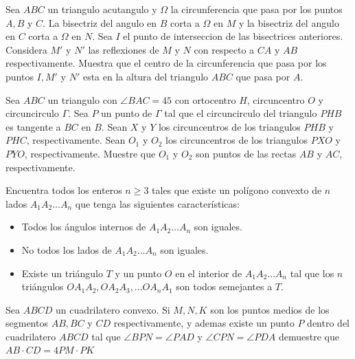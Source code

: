 \documentclass[11pt]{scrartcl}
\begin{document}
\begin{problem}
[2018/6] Sea $ABC$ un triangulo acutangulo y $\Omega$ la circunferencia que pasa por los puntos $A,B$ y $C$. La bisectriz del angulo en $B$ corta a $\Omega$ en $M$ y la bisectriz del angulo en $C$ corta a $\Omega$ en $N$. Sea $I$ el punto de interseccion de las bisectrices anteriores. Considera $M'$ y $N'$ las reflexiones de $M$ y $N$ con respecto a $CA$ y $AB$ respectivamente. Muestra que el centro de la circunferencia que pasa por los puntos $I,M'$ y $N'$ esta en la altura del triangulo $ABC$ que pasa por $A$.
\end{problem}

\begin{problem}
[2019/6] Sea $ABC$ un triangulo con $\angle{BAC}=45$ con ortocentro $H$, circuncentro $O$ y circuncirculo $\Gamma$. Sea $P$ un punto de $\Gamma$ tal que el circuncirculo del triangulo $PHB$ es tangente a $BC$ en $B$. Sean $X$ y $Y$ los circuncentros de los triangulos $PHB$ y $PHC$, respectivamente. Sean $O_1$ y $O_2$ los circuncentros de los triangulos $PXO$ y $PYO$, respectivamente. Muestre que $O_1$ y $O_2$ son puntos de las rectas $AB$ y $AC$, respectivamente.
\end{problem}

\begin{problem}
    [2022/6] 
    Encuentra todos los enteros $n\geq 3$ tales que existe un polígono convexto de $n$ lados $A_1A_2\dots A_n$ que tenga las siguientes características:
 \begin{itemize} 
 \item  Todos los ángulos internos de $A_1A_2\dots A_n$ son iguales. 
 \item  No todos los lados de $A_1A_2\dots A_n$ son iguales.
 \item  Existe un triángulo $T$ y un punto $O$ en el interior de $A_1A_2\dots A_n$ tal que los $n$ triángulos $OA_1A_2, OA_2A_3,\dots OA_nA_1$ son todos semejantes a $T$.
 \end{itemize} 
\end{problem}
\begin{problem} [2023/3]
    Sea $ABCD$ un cuadrilatero convexo. Si $M,N,K$ son los puntos medios de los segmentos $AB,BC$ y $CD$ respectivamente, y ademas existe un punto $P$ dentro del cuadrilatero $ABCD$ tal que $\angle BPN =\angle PAD$ y $\angle CPN=\angle PDA$ demuestre que $AB\cdot CD =4PM \cdot PK$
\end{problem}
\end{document}
